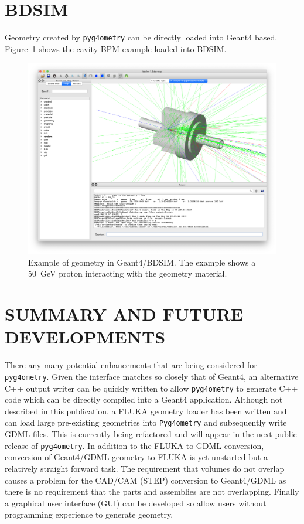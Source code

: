 \documentclass[a4paper,
               keeplastbox,   %
               ]{jacow}
\begin{document}
\section{BDSIM}
Geometry created by \verb|pyg4ometry| can be directly loaded into Geant4 based. Figure~\ref{fig:dipole-bdsim} shows the cavity BPM 
example loaded into BDSIM. 
\begin{figure}[h!tb]
   \centering
   \includegraphics*[width=1.0\columnwidth]{./examples/dipole_bdsim.jpg}
   \caption{Example of geometry in Geant4/BDSIM. The example shows a 50~GeV proton interacting with the geometry material.}
   \label{fig:dipole-bdsim}
\end{figure}

\section{SUMMARY AND FUTURE DEVELOPMENTS}
There any many potential enhancements that are being considered for \verb|pyg4ometry|. Given the interface matches so closely that of Geant4, 
an alternative C++ output writer can be quickly written to allow \verb|pyg4ometry| to generate C++ code which can be directly compiled into a 
Geant4 application. Although not described in this publication, a FLUKA geometry loader has been written and can load large pre-existing geometries into 
\verb|Pyg4ometry| and subsequently write GDML files. This is currently being refactored and will appear in the next public release of \verb|pyg4ometry|.
In addition to the FLUKA to GDML conversion, conversion of Geant4/GDML geometry to FLUKA is yet unstarted but a relatively straight forward
task. The requirement that volumes do not overlap causes a problem for the CAD/CAM (STEP) conversion to Geant4/GDML as there is no requirement 
that the parts and assemblies are not overlapping. Finally a graphical user interface (GUI) can be developed so allow users without programming 
experience to generate geometry.
\end{document}
